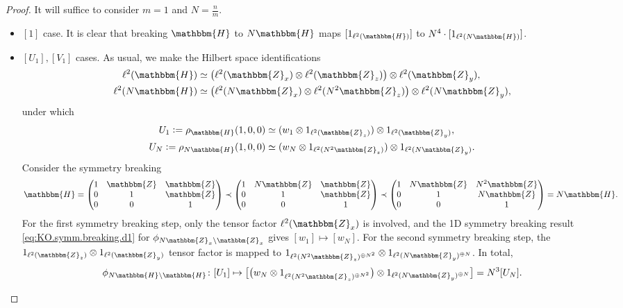 \documentclass{amsart}
\numberwithin{figure}{section}
\numberwithin{equation}{section}
\numberwithin{table}{section}
\theoremstyle{plain}
\theoremstyle{definition}
\theoremstyle{remark}
\theoremstyle{nonumber}
\newcommand{\Z}{\mathbb{Z}}
\newcommand{\HH}{\mathbb{H}} %
\newcommand{\defeq}{\mathrel{\vcentcolon=}}
\renewcommand{\mathbb}{\mathbbm} %
\begin{document}
\begin{proof}
It will suffice to consider $m=1$ and $N=\frac{n}{m}$.
\begin{itemize}
\item $[1]$ case. It is clear that breaking $\HH$ to $N\HH$ maps $[1_{\ell^2(\HH)}]$ to $N^4\cdot [1_{\ell^2(N\HH)}]$.
\item {} $[U_1], [V_1]$ cases.
As usual, we make the Hilbert space identifications
\begin{equation}\label{eq:Heis.Hilbert.decomposition}
\begin{aligned}
\ell^2(\HH)&\simeq \big(\ell^2(\Z_x)\otimes \ell^2(\Z_z)\big)\otimes \ell^2(\Z_y),\\
\ell^2(N\HH) & \simeq \big(\ell^2(N\Z_x)\otimes \ell^2(N^2\Z_z)\big)\otimes \ell^2(N\Z_y),
\end{aligned}
\end{equation}
under which
\begin{equation}\label{eq:tensor.form.U}
\begin{aligned}
U_1\defeq \rho_{\HH}(1,0,0) &\simeq (w_1\otimes 1_{\ell^2(\Z_z)})\otimes 1_{\ell^2(\Z_y)},\\
U_N\defeq \rho_{N\HH}(1,0,0) &\simeq (w_N\otimes 1_{\ell^2(N^2\Z_z)})\otimes 1_{\ell^2(N\Z_y)}.
\end{aligned}
\end{equation}
Consider the symmetry breaking
\[
\HH=\begin{pmatrix}1 & \Z & \Z \\ 0 & 1 & \Z\\ 0 & 0 & 1\end{pmatrix}\prec \begin{pmatrix} 1 & N\Z & \Z \\ 0 & 1 & \Z\\ 0 & 0 & 1 \end{pmatrix}\prec \begin{pmatrix} 1 & N\Z & N^2\Z \\ 0 & 1 & N\Z\\ 0 & 0 & 1 \end{pmatrix}=N\HH.
\]
For the first symmetry breaking step, only the tensor factor $\ell^2(\Z_x)$ is involved, and the 1D symmetry breaking result \eqref{eq:KO.symm.breaking.d1} for $\phi_{N\Z_x\backslash \Z_x}$ gives $[w_1]\mapsto [w_N]$. For the second symmetry breaking step, the $1_{\ell^2(\Z_z)}\otimes1_{\ell^2(\Z_y)}$ tensor factor is mapped to $1_{\ell^2(N^2\Z_z)^{\oplus N^2}}\otimes 1_{\ell^2(N\Z_y)^{\oplus N}}$. In total, 
\[
\phi_{N\HH\backslash \HH}\colon [U_1]\mapsto \big[\big(w_N\otimes 1_{\ell^2(N^2\Z_z)^{\oplus N^2}}\big)\otimes 1_{\ell^2(N\Z_y)^{\oplus N}}\big]=N^3[U_N].
\]



\end{itemize}
\end{proof}
\end{document}
